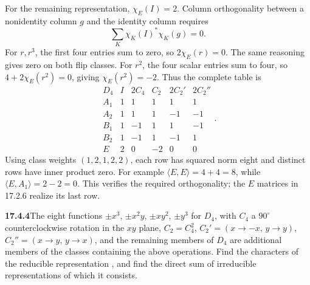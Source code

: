 For the remaining representation, $\chi_E(I)=2$.
Column orthogonality between a nonidentity column $g$ and the
identity column requires
\[
\sum_K \chi_K(I)^*\chi_K(g)=0.
\]
For $r,r^3$, the first four entries sum to zero, so
$2\chi_E(r)=0$. The same reasoning gives zero on both flip classes.
For $r^2$, the four scalar entries sum to four, so
$4+2\chi_E(r^2)=0$, giving $\chi_E(r^2)=-2$.
Thus the complete table is
\[
\boxed{\begin{array}{c|rrrrr}
D_4&I&2C_4&C_2&2C_2'&2C_2''\\\hline
A_1&1&1&1&1&1\\
A_2&1&1&1&-1&-1\\
B_1&1&-1&1&1&-1\\
B_2&1&-1&1&-1&1\\
E&2&0&-2&0&0
\end{array}}.
\]
Using class weights $(1,2,1,2,2)$, each row has squared norm
eight and distinct rows have inner product zero.
For example $\langle E,E\rangle=4+4=8$, while
$\langle E,A_1\rangle=2-2=0$. This verifies the required
orthogonality; the $E$ matrices in 17.2.6 realize its last row.

\par\bigskip
\noindent\textbf{17.4.4}\quad The eight functions $\pm x^{3}$,
$\pm x^{2}y$, $\pm xy^{2}$, $\pm y^{3}$  for
$D_{4}$, with $C_{4}$ a $90^{\circ}$ counterclockwise rotation in the
$xy$ plane, $C_{2}=C_{4}^{2}$, $C_{2}'=(x\to -x,\,y\to y)$,
$C_{2}''=(x\to y,\,y\to x)$, and the remaining members of $D_{4}$ are
additional members of the classes containing the above operations.
Find the characters of the reducible representation ,
and find the direct sum of irreducible representations of which it consists.
\par{}
\solution
{}

